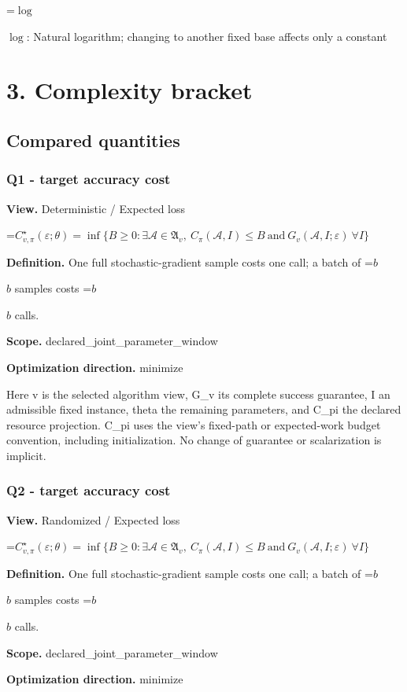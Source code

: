 \documentclass[10pt,a4paper]{article}
\newcommand{\AtlasMath}[1]{\par\begingroup\centering\setbox0=\hbox{$\displaystyle #1$}\ifdim\wd0>1.4\linewidth\typeout{ATLAS WIDE FORMULA: \the\wd0}\fi\ifdim\wd0>\linewidth\resizebox{\linewidth}{!}{\box0}\else\box0\fi\par\endgroup}
\newcommand{\AtlasInlineMath}[1]{\begingroup\setbox0=\hbox{$#1$}\ifdim\wd0>.4\linewidth\endgroup\AtlasMath{#1}\else\endgroup$#1$\fi}
\begin{document}
\AtlasInlineMath{\log}: Natural logarithm; changing to another fixed base affects only a constant

\section{3. Complexity bracket}
\subsection{Compared quantities}
\subsubsection{Q1 - target accuracy cost}
\textbf{View.} Deterministic / Expected loss

\AtlasMath{C^\star_{v,\pi}(\varepsilon;\theta)=\inf\{B\ge0:\exists\mathcal A\in\mathfrak A_v,\ C_\pi(\mathcal A,I)\le B\ \text{and}\ G_v(\mathcal A,I;\varepsilon)\ \forall I\}}
\textbf{Definition.} One full stochastic-gradient sample costs one call; a batch of \AtlasInlineMath{b} samples costs \AtlasInlineMath{b} calls.

\textbf{Scope.} declared\_joint\_parameter\_window

\textbf{Optimization direction.} minimize

Here v is the selected algorithm view, G\_v its complete success guarantee, I an admissible fixed instance, theta the remaining parameters, and C\_pi the declared resource projection. C\_pi uses the view's fixed-path or expected-work budget convention, including initialization. No change of guarantee or scalarization is implicit.

\subsubsection{Q2 - target accuracy cost}
\textbf{View.} Randomized / Expected loss

\AtlasMath{C^\star_{v,\pi}(\varepsilon;\theta)=\inf\{B\ge0:\exists\mathcal A\in\mathfrak A_v,\ C_\pi(\mathcal A,I)\le B\ \text{and}\ G_v(\mathcal A,I;\varepsilon)\ \forall I\}}
\textbf{Definition.} One full stochastic-gradient sample costs one call; a batch of \AtlasInlineMath{b} samples costs \AtlasInlineMath{b} calls.

\textbf{Scope.} declared\_joint\_parameter\_window

\textbf{Optimization direction.} minimize
\end{document}
